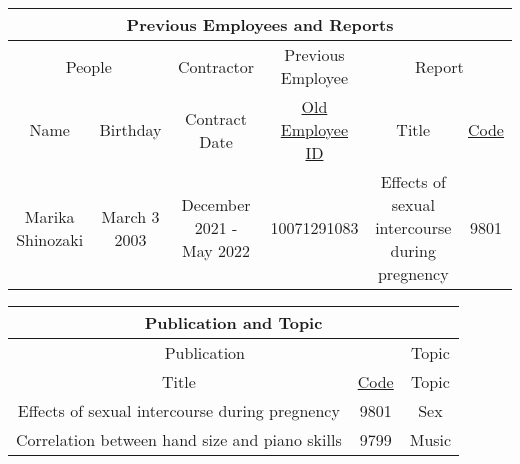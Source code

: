 \documentclass[12pt]{article}
\begin{document}
\begin{center}
    \begin{tabular}{|c|c||c||c ||c| c|}
        \hline
        \multicolumn{6}{|c|}{\cellcolor{gray!25}Previous Employees and Reports}                                                                                            \\
        \hline
        \hline
        \multicolumn{2}{|c||}{\cellcolor{gray!25}People}
                         & {\cellcolor{gray!25}Contractor}
                         & {\cellcolor{gray!25}Previous Employee}
                         & \multicolumn{2}{c|}{\cellcolor{gray!25}Report}                                                                                                  \\
        \hline
        \cellcolor{gray!25} Name
                         & \cellcolor{gray!25}Birthday
                         & \cellcolor{gray!25}Contract Date
                         & \cellcolor{gray!25}\underline{Old Employee ID}
                         & \cellcolor{gray!25}Title
                         & \cellcolor{gray!25}\underline{Code}                                                                                                             \\
        \hline \hline
        Marika Shinozaki & March 3 2003                                   & December 2021 - May 2022 & 10071291083 & Effects of sexual intercourse during pregnency & 9801 \\ \hline
    \end{tabular}
\end{center}
\begin{center}
    \begin{tabular}{|c|c||c|}
        \hline
        \multicolumn{3}{|c|}{\cellcolor{gray!25}Publication and Topic}                               \\
        \hline
        \hline
        \multicolumn{2}{|c||}{\cellcolor{gray!25}Publication}
                                                       & {\cellcolor{gray!25}Topic}                  \\
        \hline
        \cellcolor{gray!25}Title
                                                       & \cellcolor{gray!25}\underline{Code}
                                                       & \cellcolor{gray!25}Topic                    \\
        \hline \hline
        Effects of sexual intercourse during pregnency & 9801                                & Sex   \\ \hline
        Correlation between hand size and piano skills & 9799                                & Music \\ \hline
    \end{tabular}
\end{center}
\end{document}
